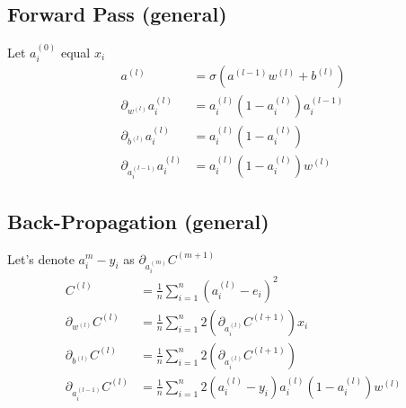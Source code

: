 \documentclass{article}
\numberwithin{equation}{subsection}
\begin{document}
\subsection{Forward Pass (general)}

Let $a_{i}^{(0)}$ equal $x_i$
\begin{align}
  a^{(l)} &= \sigma(a^{(l-1)}w^{(l)} + b^{(l)}) \\
  \partial_{w^{(l)}}a_i^{(l)} &= a_i^{(l)}(1-a_i^{(l)})a_i^{(l-1)} \\  
  \partial_{b^{(l)}}a_i^{(l)} &= a_i^{(l)}(1-a_i^{(l)}) \\
  \partial_{a_i^{(l-1)}}a_i^{(l)} &= a_i^{(l)}(1-a_i^{(l)})w^{(l)}
\end{align}

\subsection{Back-Propagation (general)}

Let's denote $a_{i}^{m} - y_i$ as $\partial_{a_i^{(m)}}C^{(m+1)}$
\begin{align}
  C^{(l)} &= \frac{1}{n}\sum_{i=1}^{n}(a_i^{(l)} - e_i)^2 \\
  \partial_{w^{(l)}}C^{(l)} &= \frac{1}{n}\sum_{i=1}^{n} 2(\partial_{a_i^{(l)}}C^{(l+1)})x_i \\
  \partial_{b^{(l)}}C^{(l)} &= \frac{1}{n}\sum_{i=1}^{n} 2(\partial_{a_i^{(l)}}C^{(l+1)}) \\
  \partial_{a_i^{(l-1)}}C^{(l)} &= \frac{1}{n}\sum_{i=1}^{n}2(a_i^{(l)}-y_i)a_i^{(l)}(1-a_i^{(l)})w^{(l)}
\end{align}
\end{document}
